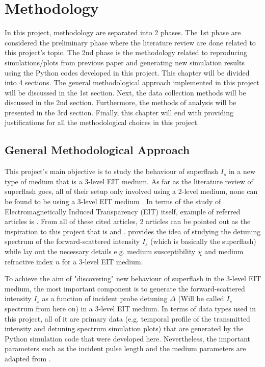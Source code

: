 \chapter{Methodology}
In this project, methodology are separated into 2 phases. The 1st phase are considered the preliminary phase where the literature review are done related to this project's topic. The 2nd phase is the methodology related to reproducing simulations/plots from previous paper and generating new simulation results using the Python codes developed in this project. This chapter will be divided into 4 sections. The general methodological approach implemented in this project will be discussed in the 1st section. Next, the data collection methods will be discussed in the 2nd section. Furthermore, the methods of analysis will be presented in the 3rd section. Finally, this chapter will end with providing justifications for all the methodological choices in this project.

\section{General Methodological Approach}
This project's main objective is to study the behaviour of superflash $I_{s}$ in a new type of medium that is a 3-level EIT medium. As far as the literature review of superflash goes, all of their setup only involved using a 2-level medium, none can be found to be using a 3-level EIT medium \cite{Kwong2014, Kwong2015, Kwong2017, Kwong2020}. In terms of the study of Electromagnetically Induced Transparency (EIT) itself, example of referred articles is . From all of these cited articles, 2 articles can be pointed out as the inspiration to this project that is  and .  provides the idea of studying the detuning spectrum of the forward-scattered intensity $I_{s}$ (which is basically the superflash) while  lay out the necessary details e.g. medium susceptibility $\chi$ and medium refractive index $n$ for a 3-level EIT medium.

To achieve the aim of "discovering" new behaviour of superflash in the 3-level EIT medium, the most important component is to generate the forward-scattered intensity $I_{s}$ as a function of incident probe detuning $\Delta$ (Will be called $I_{s}$ spectrum from here on) in a 3-level EIT medium. In terms of data types used in this project, all of it are primary data (e.g. temporal profile of the transmitted intensity and detuning spectrum simulation plots) that are generated by the Python simulation code that were developed here. Nevertheless, the important parameters such as the incident pulse length and the medium parameters are adapted from .

